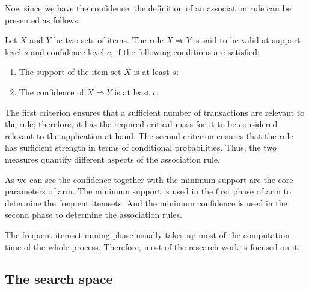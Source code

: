 Now since we have the confidence, the definition of an association rule can be presented as follows:
\begin{definition}
    Let $X$ and $Y$ be two sets of items.
    The rule $X \Rightarrow Y$ is said to be valid at support level $s$ and confidence level $c$, if the following conditions are satisfied:
    \begin{enumerate}
        \item The support of the item set $X$ is at least $s$;
        \item The confidence of $X \Rightarrow Y$ is at least $c$;
    \end{enumerate}
    The first criterion ensures that a sufficient number of transactions are relevant to the rule; therefore, it has the required critical mass for it to be considered relevant to the application at hand.
    The second criterion ensures that the rule has sufficient strength in terms of conditional probabilities.
    Thus, the two measures quantify different aspects of the association rule.
\end{definition}
As we can see the confidence together with the minimum support are the core parameters of \acl{arm}.
The minimum support is used in the first phase of \acl{arm} to determine the frequent itemsets.
And the minimum confidence is used in the second phase to determine the association rules.

The frequent itemset mining phase usually takes up most of the computation time of the whole process.
Therefore, most of the research work is focused on it.
\subsection{The search space}
\label{sub:search_space}

